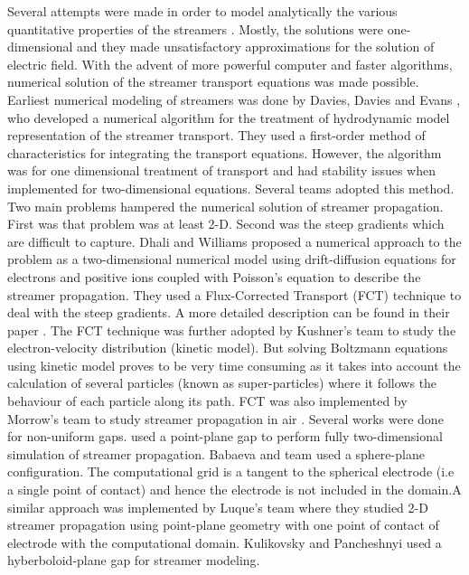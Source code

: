 \documentclass{article}
\begin{document}
Several attempts were made in order to model analytically the various quantitative properties of the streamers \cite{Wright1964ASpark} \cite{Dawson1965APropagation} \cite{Albright1972IonizingStreamers}. Mostly, the solutions were one-dimensional and they made unsatisfactory approximations for the solution of electric field. With the advent of more powerful computer and faster algorithms, numerical solution of the streamer transport equations was made possible. Earliest numerical modeling of streamers was done by Davies, Davies and Evans \cite{Davies1971ComputerDischarges}, who developed a numerical algorithm for the treatment of hydrodynamic model representation of the streamer transport. They used a first-order method of characteristics for integrating the transport equations. However, the algorithm was for one dimensional treatment of transport and had stability issues when implemented for two-dimensional equations. Several teams \cite{Kline1974CalculationsGaps} \cite{Abbas1980ABreakdown} \cite{Yoshida1976ComputerOvervoltages} adopted this method. Two main problems hampered the numerical solution of streamer propagation. First was that problem was at least 2-D. Second was the steep gradients which are difficult to capture. Dhali and Williams proposed a numerical approach to the problem as a two-dimensional numerical model using drift-diffusion equations for electrons and positive ions coupled with Poisson's equation to describe the streamer propagation. They used a Flux-Corrected Transport (FCT) technique to deal with the steep gradients. A more detailed description can be found in their paper \cite{Dhali1987TwodimensionalGases}. The FCT technique was further adopted by Kushner's team \cite{DiCarlo1989SolvingTransport} to study the electron-velocity distribution (kinetic model). But solving Boltzmann equations using kinetic model proves to be very time consuming as it takes into account the calculation of several particles (known as super-particles) where it follows the behaviour of each particle along its path. FCT was also implemented by Morrow's team to study streamer propagation in air \cite{Morrow1997StreamerAir}. Several works were done for non-uniform gaps. \cite{Vitello1994SimulationNitrogen} used a point-plane gap to perform fully two-dimensional simulation of streamer propagation. Babaeva and team \cite{ISI:A1997XK56000036} used a sphere-plane configuration. The computational grid is a tangent to the spherical electrode (i.e a single point of contact) and hence the electrode is not included in the domain.A similar approach was implemented by Luque's team \cite{Luque2008PositiveVelocities} where they studied 2-D streamer propagation using point-plane geometry with one point of contact of electrode with the computational domain. Kulikovsky \cite{Kulikovsky1994TheSimulation} and Pancheshnyi \cite{Pancheshnyi2005DevelopmentSimulation} used a hyberboloid-plane gap for streamer modeling.
\end{document}
